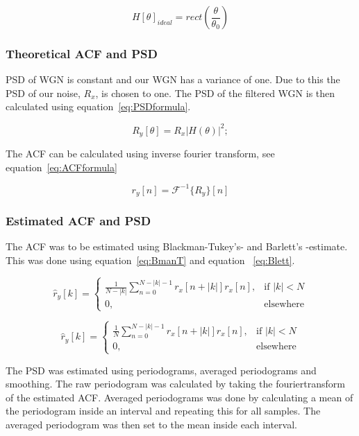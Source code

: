 \documentclass[10pt]{article}
\begin{document}
\begin{equation}
  \label{eq:idealH}
  H[\theta]_{ideal} =rect(\frac{\theta}{\theta_0} )
\end{equation}

\subsubsection{Theoretical ACF and PSD}
PSD of WGN is constant and our WGN has a variance of one. Due to this the PSD
of our noise, $R_x$, is chosen to one.
The PSD of the filtered WGN is then calculated using equation~\ref{eq:PSDformula}.

\begin{equation}
  \label{eq:PSDformula}
  R_y[\theta] = R_x|H(\theta)|^2;
\end{equation}

The ACF can be calculated using inverse fourier transform, see equation~\ref{eq:ACFformula}

\begin{equation}
  \label{eq:ACFformula}
  r_y[n] = \mathcal{F}^{-1}\{R_y\}[n]
\end{equation}



\subsubsection{Estimated ACF and PSD}
The ACF was to be estimated using Blackman-Tukey's- and Barlett's -estimate.
This was done using equation~\ref{eq:BmanT} and equation ~\ref{eq:Blett}.

\begin{equation}
\label{eq:BmanT}
\hat{r}_y[k] =
\begin{cases}
    \frac{1}{N-|k|}\sum_{n=0}^{N-|k|-1}r_x[n+|k|]r_x[n],& \text{if } |k|< N\\
    0,              & \text{elsewhere}
\end{cases}
\end{equation}


\begin{equation}
\label{eq:Blett}
\hat{r}_y[k] =
\begin{cases}
    \frac{1}{N}\sum_{n=0}^{N-|k|-1}r_x[n+|k|]r_x[n],& \text{if } |k|< N\\
    0,              & \text{elsewhere}
\end{cases}
\end{equation}

The PSD was estimated using periodograms, averaged periodograms
and smoothing. The raw periodogram was calculated by taking the fouriertransform
of the estimated ACF.
Averaged periodograms was done by calculating a mean of the periodogram inside
an interval and repeating this for all samples. The averaged periodogram was
then set to the mean inside each interval.
\end{document}
